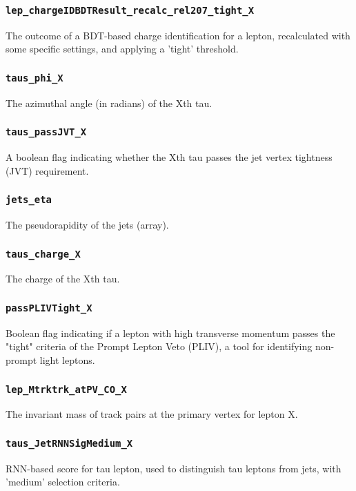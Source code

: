 \subsubsection{\texttt{lep\_chargeIDBDTResult\_recalc\_rel207\_tight\_X}} The outcome of a BDT-based charge identification
for a lepton, recalculated with some specific settings, and applying a 'tight' threshold.

\subsubsection{\texttt{taus\_phi\_X}} The azimuthal angle (in radians) of the Xth tau.

\subsubsection{\texttt{taus\_passJVT\_X}} A boolean flag indicating whether the Xth tau passes the jet vertex tightness
(JVT) requirement.

\subsubsection{\texttt{jets\_eta}} The pseudorapidity of the jets (array).

\subsubsection{\texttt{taus\_charge\_X}} The charge of the Xth tau.

\subsubsection{\texttt{passPLIVTight\_X}} Boolean flag indicating if a lepton with high transverse momentum passes the
"tight" criteria of the Prompt Lepton Veto (PLIV), a tool for identifying non-prompt light leptons.

\subsubsection{\texttt{lep\_Mtrktrk\_atPV\_CO\_X}} The invariant mass of track pairs at the primary vertex for lepton X.

\subsubsection{\texttt{taus\_JetRNNSigMedium\_X}} RNN-based score for tau lepton, used to distinguish tau leptons from
jets, with 'medium' selection criteria.

